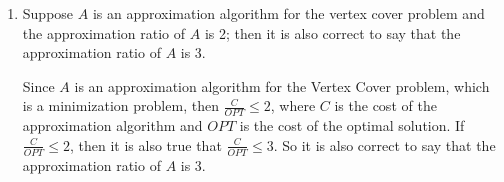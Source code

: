 \documentclass[paper=a4, fontsize=11pt]{scrartcl} %
\numberwithin{figure}{section} %
\numberwithin{table}{section} %
\begin{document}
\begin{enumerate}
\begin{enumerate}
\begin{enumerate}
\end{enumerate}

\item Suppose $A$ is an approximation algorithm for the vertex cover problem and the approximation ratio of $A$ is 2; then it is also correct to say that the approximation ratio of $A$ is 3.

Since $A$ is an approximation algorithm for the Vertex Cover problem, which is a minimization problem, then $\frac{C}{OPT} \leq 2$, where $C$ is the cost of the approximation algorithm and $OPT$ is the cost of the optimal solution. If $\frac{C}{OPT} \leq 2$, then it is also true that $\frac{C}{OPT} \leq 3$. So it is also correct to say that the approximation ratio of $A$ is 3.

\end{enumerate}

\end{enumerate}

\end{document}
